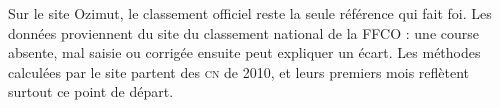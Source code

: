 \documentclass[11pt,a4paper]{article}
\newcommand{\CN}{\textsc{cn}}
\begin{document}
Sur le site Ozimut, le classement officiel reste la seule référence qui fait foi. Les données proviennent du site du classement national de la FFCO : une course absente, mal saisie ou corrigée ensuite peut expliquer un écart. Les méthodes calculées par le site partent des \CN{} de 2010, et leurs premiers mois reflètent surtout ce point de départ.
\end{document}

